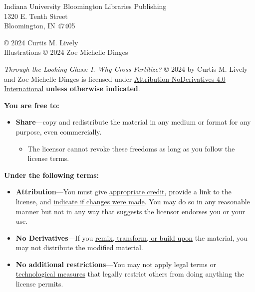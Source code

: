 \null\vfill
\begin{flushleft}
\thispagestyle{empty}
Indiana University Bloomington Libraries Publishing\\
1320 E. Tenth Street\\
Bloomington, IN 47405
\vspace{5mm}

© 2024 Curtis M. Lively\\
Illustrations © 2024 Zoe Michelle Dinges

\vspace{4mm}
\ccbynd

\textit{Through the Looking Glass: I. Why Cross-Fertilize?} © 2024 by Curtis M. Lively and Zoe Michelle Dinges is licensed under \href{https://creativecommons.org/licenses/by-nd/4.0/}{Attribution-NoDerivatives 4.0 International} \textbf{unless otherwise indicated}.  

\vspace{3mm}

\textbf{You are free to:}
\begin{itemize}
\tightlist
\item \textbf{Share}---copy and redistribute the material in any medium or format for any purpose, even commercially.
  \begin{itemize}
    \item The licensor cannot revoke these freedoms as long as you follow the license terms.
  \end{itemize}
\end{itemize}

\vspace{3mm}

\textbf{Under the following terms:}
\begin{itemize}
\tightlist
\item \textbf{Attribution}---You must give \href{https://creativecommons.org/licenses/by/4.0/\#ref-appropriate-credit}{appropriate credit}, provide a link to the license, and \href{https://creativecommons.org/licenses/by/4.0/\#ref-indicate-changes}{indicate if changes were made}. You may do so in any reasonable manner but not in any way that suggests the licensor endorses you or your use.\\
\item \textbf{No Derivatives}---If you \href{https://creativecommons.org/licenses/by-nd/4.0/#ref-some-kinds-of-mods}{remix, transform, or build upon} the material, you may not distribute the modified material.
\item \textbf{No additional restrictions}---You may not apply legal terms or \href{https://creativecommons.org/licenses/by/4.0/\#ref-technological-measures}{technological measures} that legally restrict others from doing anything the license permits.
\end{itemize}


\end{flushleft}
